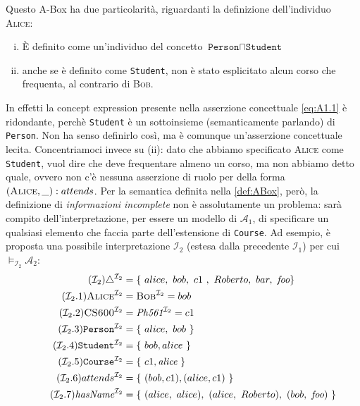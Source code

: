 \noindent
Questo A-Box ha due particolarità, riguardanti la definizione dell'individuo \textsc{Alice}:
\begin{enumerate}[(i)]
	\item È definito come un'individuo del concetto $\texttt{Person} \sqcap \texttt{Student}$
	\item anche se è definito come \texttt{Student}, non è stato esplicitato alcun corso che frequenta, al contrario di \textsc{Bob}.
\end{enumerate}
In effetti la concept expression presente nella asserzione concettuale \eqref{eq:A1.1} è ridondante, perchè \texttt{Student} è un sottoinsieme (semanticamente parlando) di \texttt{Person}. Non ha senso definirlo così, ma è comunque un'asserzione concettuale lecita. Concentriamoci invece su (ii): dato che abbiamo specificato \textsc{Alice} come \texttt{Student}, vuol dire che deve frequentare almeno un corso, ma non abbiamo detto quale, ovvero non c'è nessuna asserzione di ruolo per della forma $(\textsc{Alice}, \_) : attends$. Per la semantica definita nella \autoref{def:ABox}, però, la definizione di \textit{informazioni incomplete} non è assolutamente un problema: sarà compito dell'interpretazione, per essere un modello di $\mathcal{A}_1$, di specificare un qualsiasi elemento che faccia parte dell'estensione di \texttt{Course}. Ad esempio, è proposta una possibile interpretazione $\mathcal{I}_2$ (estesa dalla precedente $\mathcal{I}_1$) per cui $\models_{\mathcal{I}_2} \mathcal{A}_2$:
\begin{align}
	\tag{$\mathcal{I}_2$} \label{eq:I2}
	\triangle^{\mathcal{I}_2} &= \{\ alice,\ bob,\ c1\ ,\ Roberto,\ bar,\ \textit{foo}\}\\
	\tag{$\mathcal{I}_2$.1} \label{eq:I2.1}
	\textsc{Alice}^{\mathcal{I}_2} &= \textsc{Bob}^{\mathcal{I}_2} = bob\\
	\tag{$\mathcal{I}_2$.2} \label{eq:I2.2}
	\textsc{CS600}^{\mathcal{I}_2} &= \textit{Ph561}^{\mathcal{I}_2} = c1\\
	\tag{$\mathcal{I}_2$.3} \label{eq:I2.3}
	\texttt{Person}^{\mathcal{I}_2} &= \{\ alice,\ bob\ \}\\
	\tag{$\mathcal{I}_2$.4} \label{eq:I2.4}
	\texttt{Student}^{\mathcal{I}_2} &= \{\ bob, alice\ \} \\
	\tag{$\mathcal{I}_2$.5} \label{eq:I2.5}
	\texttt{Course}^{\mathcal{I}_2} &= \{\ c1, \textit{alice}\ \}\\
	\tag{$\mathcal{I}_2$.6} \label{eq:I2.6}
	attends^{\mathcal{I}_2} &= \{\ (bob, c1), (alice, c1)\ \}\\
	\tag{$\mathcal{I}_2$.7} \label{eq:I2.7}
	\textit{hasName}^{\mathcal{I}_2} &= \{\ (alice,\ alice),\ (alice,\ Roberto),\ (bob,\ \textit{foo})\ \}
\end{align}
